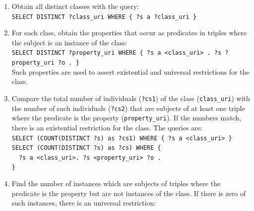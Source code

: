 \documentclass[review]{elsarticle}
\newcommand{\textttt}[1] {\texttt{\footnotesize#1}}
\newcommand{\h} {\hphantom ~ }
\begin{document}
\begin{enumerate}[leftmargin=0cm]
    \item Obtain all distinct classes with the query:\\
        \textttt{SELECT DISTINCT ?class\_uri WHERE \{ ?s a ?class\_uri \}}
\item For each class, obtain the properties that occur as predicates in triples where the subject is an instance of the class:\\
	\textttt{SELECT DISTINCT ?property\_uri WHERE \{ ?s a <class\_uri> . ?s ?property\_uri ?o . \}}\\
Such properties are used to assert existential and universal restrictions for the class.
\item Compare the total number of individuals (\textttt{?cs1}) of the class (\textttt{class\_uri}) with
	the number of such individuals (\textttt{?cs2}) that are subjects of at least one triple where 
	the predicate is the property (\textttt{property\_uri}).
	If the numbers match, there is an existential restriction for the class. The queries are:\\
	\textttt{SELECT (COUNT(DISTINCT ?s) as ?cs1) WHERE \{ ?s a <class\_uri> \}}\\
	\textttt{SELECT (COUNT(DISTINCT ?s) as ?cs) WHERE \{\\
	\h ?s a <class\_uri>. ?s <property\_uri> ?o .\\ \}}
\item Find the number of instances which are subjects of triples where the predicate is the property but are not instances of the class.
	If there is zero of such instances, there is an universal restriction:\\

\end{enumerate}
\end{document}
